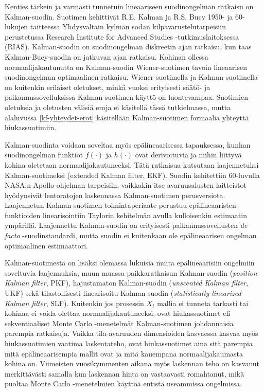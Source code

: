 \documentclass[
  12pt,
  a4paper, twoside]{book}
\begin{document}
Kenties tärkein ja varmasti tunnetuin lineaariseen suodinongelman ratkaisu on Kalman-suodin. Suotimen kehittivät R.E. Kalman ja R.S. Bucy 1950- ja 60-lukujen taitteessa Yhdysvaltain kylmän sodan kilpavarustelutarpeisiin perustetussa Research Institute for Advanced Studies -tutkimuslaitoksessa (RIAS). Kalman-suodin on suodinongelman diskreetin ajan ratkaisu, kun taas Kalman-Bucy-suodin on jatkuvan ajan ratkaisu. Kohinan ollessa normaalijakautunutta on Kalman-suodin Wiener-suotimen tavoin lineaarisen suodinongelman optimaalinen ratkaisu. Wiener-suotimella ja Kalman-suotimella on kuitenkin erilaiset oletukset, minkä vuoksi erityisesti säätö- ja paikannussovelluksissa Kalman-suotimen käyttö on luontevampaa. Suotimien oletuksia ja oletusten välisiä eroja ei käsitellä tässä tutkielmassa, mutta alaluvussa \ref{kf-yhteydet-erot} käsitellään Kalman-suotimen formaalia yhteyttä hiukassuotimiin.

Kalman-suodinta voidaan soveltaa myös epälineaarisessa tapauksessa, kunhan suodinongelman funktiot \(f(\cdot)\) ja \(h(\cdot)\) ovat derivoituvia ja niihin liittyvä kohina oletetaan normaalijakautuneeksi. Tätä ratkaisua kutsutaan laajennetuksi Kalman-suotimeksi (extended Kalman filter, EKF). Suodin kehitettiin 60-luvulla NASA:n Apollo-ohjelman tarpeisiin, vaikkakin itse avaruusalusten laitteistot hyödynsivät lentoratojen laskennassa Kalman-suotimen perusversiota. Laajennetun Kalman-suotimen toimintaperiaate perustuu epälineaaristen funktioiden linearisointiin Taylorin kehitelmän avulla kulloisenkin estimaatin ympärillä. Laajennettu Kalman-suodin on erityisesti paikannussovellusten \textit{de facto} -suodinstandardi, mutta suodin ei kuitenkaan ole epälineaarisen ongelman optimaalinen estimaattori.

Kalman-suotimesta on lisäksi olemassa lukuisia muita epälineaarisiin ongelmiin soveltuvia laajennuksia, muun muassa paikkaratkaisun Kalman-suodin (\emph{position Kalman filter}, PKF), hajustamaton Kalman-suodin (\emph{unscented Kalman filter}, UKF) sekä tilastollisesti linearisoitu Kalman-suodin (\emph{statistically linearized Kalman filter}, SLF). Kuitenkin jos prosessin \(X_t\) mallia ei tunneta tarkasti tai kohinaa ei voida olettaa normaalijakautuneeksi, ovat hiukassuotimet eli sekventiaaliset Monte Carlo -menetelmät Kalman-suotimen johdannaisia parempia ratkaisuja. Vaikka tila-avaruuden dimensioiden kasvaessa kasvaa myös hiukassuotimien vaatima laskentateho, ovat hiukassuotimet aina sitä parempia mitä epälineaarisempia mallit ovat ja mitä kauempana normaalijakaumasta kohina on. Viimeisten vuosikymmenten aikana myös laskennan teho on kasvanut merkittävästi samalla kun laskennan hinta on vastaavasti romahtanut, mikä puoltaa Monte Carlo -menetelmien käyttöä entistä useammissa ongelmissa.
\end{document}
